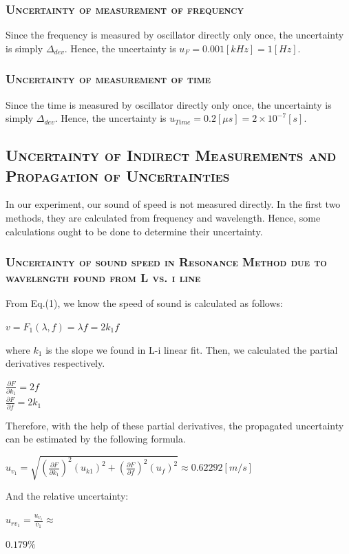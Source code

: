 \documentclass[a4paper,12pt]{article}
\begin{document}
\begin{appendices}
       \subsubsection{\textsc{Uncertainty of measurement of frequency}}
      Since the frequency is measured by oscillator directly only once, the uncertainty is simply $\Delta_{dev}$. Hence, the uncertainty is $u_F = 0.001 [kHz] = 1 [Hz]$.
       \subsubsection{\textsc{Uncertainty of measurement of time}}
      Since the time is measured by oscillator directly only once, the uncertainty is simply $\Delta_{dev}$. Hence, the uncertainty is $u_{Time} = 0.2 [\mu s] = 2 \times 10^{-7} [s]$.
      
	\subsection{\textsc{Uncertainty of Indirect Measurements and Propagation of Uncertainties}}
	In our experiment, our sound of speed is not measured directly. In the first two methods, they are calculated from frequency and wavelength. Hence, some calculations ought to be done to determine their uncertainty.
		\subsubsection{\textsc{Uncertainty of sound speed in Resonance Method due to wavelength found from L vs. i line}}
		From Eq.(1), we know the speed of sound is calculated as follows: 
		\begin{center}
		$v = F_1(\lambda, f) = \lambda f = 2 k_1 f$
		\end{center}
		\par
		where $k_1$ is the slope we found in L-i linear fit. Then, we calculated the partial derivatives respectively.
		\begin{center}
		$\displaystyle\frac{\partial F}{\partial k_1} = 2f$\\
		[3 mm]
		$\displaystyle\frac{\partial F}{\partial f} = 2k_1$
		\end{center}
		\par
		Therefore, with the help of these partial derivatives, the propagated uncertainty can be estimated by the following formula.
		\begin{center}
		$\displaystyle u_{v_1} = \sqrt{(\frac{\partial F}{\partial k_1})^2(u_{k1})^2 + (\frac{\partial F}{\partial f} )^2(u_{f})^2} \approx 0.62292 [m/s]$
		\end{center}
		\par
		And the relative uncertainty:
		\begin{center}
		\begin{large}
		$\displaystyle u_{rv_1} = \frac{u_{v_1}}{\bar v_1} \approx$
		\end{large}
		$ 0.179\%$
		\end{center}
		

\end{appendices}
\end{document}

